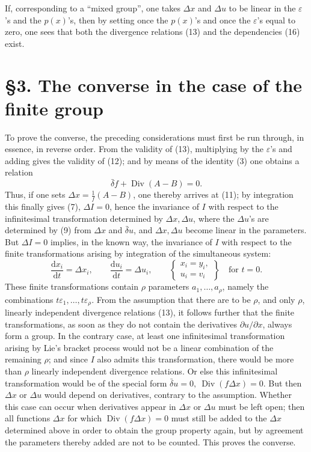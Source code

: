 \documentclass[11pt]{article}
\newcommand{\D}{\Delta}
\providecommand{\eps}{\varepsilon}
\providecommand{\dd}{\mathrm d}
\providecommand{\Div}{\operatorname{Div}}
\providecommand{\bd}{\bar{\delta}}
\providecommand{\p}{\partial}
\providecommand{\p}{\partial}
\providecommand{\dd}{\mathrm d}
\begin{document}
If, corresponding to a ``mixed group'', one takes \(\D x\) and \(\D u\) to be linear in the \(\eps\)'s and the \(p(x)\)'s, then by setting once the \(p(x)\)'s and once the \(\eps\)'s equal to zero, one sees that both the divergence relations (13) and the dependencies (16) exist.

\section*{\S{}3. The converse in the case of the finite group}

To prove the converse, the preceding considerations must first be run through, in essence, in reverse order. From the validity of (13), multiplying by the \(\eps\)'s and adding gives the validity of (12); and by means of the identity (3) one obtains a relation
\[
\bd f+\Div(A-B)=0.
\]
Thus, if one sets \(\D x=\frac1f(A-B)\), one thereby arrives at (11); by integration this finally gives (7), \(\D I=0\), hence the invariance of \(I\) with respect to the infinitesimal transformation determined by \(\D x,\D u\), where the \(\D u\)'s are determined by (9) from \(\D x\) and \(\bd u\), and \(\D x,\D u\) become linear in the parameters. But \(\D I=0\) implies, in the known way, the invariance of \(I\) with respect to the finite transformations arising by integration of the simultaneous system:
\begin{equation}
\frac{\dd x_i}{\dd t}=\D x_i,\qquad
\frac{\dd u_i}{\dd t}=\D u_i,\qquad
\left\{\begin{array}{l}
x_i=y_i,\\
u_i=v_i
\end{array}\right\}
\quad\text{for }t=0.
\tag{17}
\end{equation}
These finite transformations contain \(\rho\) parameters \(a_1,\ldots,a_\rho\), namely the combinations \(t\eps_1,\ldots,t\eps_\rho\). From the assumption that there are to be \(\rho\), and only \(\rho\), linearly independent divergence relations (13), it follows further that the finite transformations, as soon as they do not contain the derivatives \(\p u/\p x\), always form a group. In the contrary case, at least one infinitesimal transformation arising by Lie's bracket process would not be a linear combination of the remaining \(\rho\); and since \(I\) also admits this transformation, there would be more than \(\rho\) linearly independent divergence relations. Or else this infinitesimal transformation would be of the special form \(\bd u=0,\ \Div(f\D x)=0\). But then \(\D x\) or \(\D u\) would depend on derivatives, contrary to the assumption. Whether this case can occur when derivatives appear in \(\D x\) or \(\D u\) must be left open; then all functions \(\D x\) for which \(\Div(f\D x)=0\) must still be added to the \(\D x\) determined above in order to obtain the group property again, but by agreement the parameters thereby added are not to be counted. This proves the converse.
\end{document}
